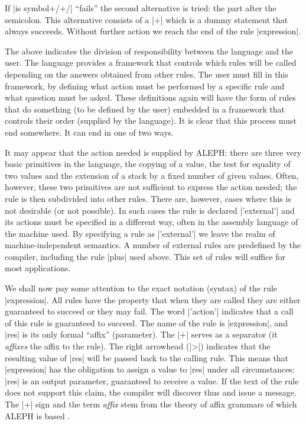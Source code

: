 \documentclass{article}
\newcommand\A{{\sf ALEPH}}
\begin{document}
If \pp|is symbol+/+/| ``fails'' %
the second alternative
is tried: the part after the semicolon. This alternative consists of a
\pp|+| which is a dummy statement that always succeeds. Without further
action we reach the end of the rule \pp|expression|.

The above indicates the division of responsibility between the language and
the user. The language provides a framework that controls which rules will
be called depending on the answers obtained from other rules. The user must
fill in this framework, by defining what action must be performed by a
specific rule and what question must be asked. These definitions again will
have the form of rules that do something (to be defined by the user)
embedded in a framework that controls their order (supplied by the language).
It is clear that this process must end somewhere. It can end in one of two
ways.

It may appear that the action needed is supplied by \A: there are three very
basic primitives in the language, the copying of a value, the test for
equality of two values and the extension of a stack by a fixed number of
given values. Often, however, these two primitives are not
sufficient to express the action needed; the rule is then subdivided into
other rules.
There are, however, cases where this is not desirable (or
not possible). In such cases the rule is declared \pp|'external'| and
its actions must be specified in a different way, often 
in the assembly
language of the machine used. By specifying a rule as \pp|'external'| we
leave the realm of machine-independent semantics. A number of external rules
are predefined by the compiler, including the rule \pp|plus| used above.
This set of rules will suffice for most applications.

We shall now pay some attention to the exact notation (syntax) of the rule
\pp|expression|. All rules have the property that when they are called they
are either guaranteed to succeed or they may fail. 
The word \pp|'action'| indicates that a call of this rule is guaranteed to
succeed. The name of the rule is \pp|expression|, and
\pp|res| is its only formal ``affix'' (parameter). The
\pp|+| serves as a separator (it \emph{affixes} the affix to the rule). The
right arrowhead (\pp|>|) indicates that the resulting value of \pp|res| will
be passed back to the calling rule. This means that \pp|expression| has the
obligation to assign a value to \pp|res| under all circumstances: \pp|res|
is an output parameter, guaranteed to receive a value. If the text of the
rule does not support this claim, the compiler will discover thus and issue a
message. The \pp|+| sign and the term \emph{affix} stem from the theory of
affix grammars of which \A{} is based \cite{koster71b,watt77}.
\end{document}
